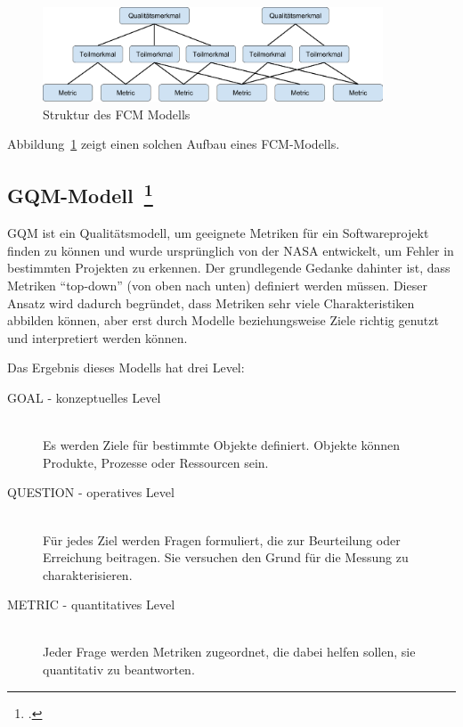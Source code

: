 \begin{savenotes}
  \begin{figure}[H] 
    \centering
    \includegraphics[width=0.9\textwidth]{img/fcm.png}
    \caption{Struktur des \ac{FCM} Modells}\label{fig:fcm}
  \end{figure}
\end{savenotes}

Abbildung~\ref{fig:fcm} zeigt einen solchen Aufbau eines \ac{FCM}-Modells.

\clearpage
\subsection[\ac{GQM}-Modell]{\acf{GQM}-Modell~\footcite[][]{basili_goal_nodate}}

\ac{GQM} ist ein Qualitätsmodell, um geeignete Metriken für ein Softwareprojekt finden zu können und wurde ursprünglich von der \ac{NASA} entwickelt, um Fehler in bestimmten Projekten zu erkennen.
Der grundlegende Gedanke dahinter ist, dass Metriken ``top\mbox{-}down'' (von oben nach unten) definiert werden müssen.
Dieser Ansatz wird dadurch begründet, dass Metriken sehr viele Charakteristiken abbilden können, aber erst durch Modelle beziehungsweise Ziele richtig genutzt und interpretiert werden können.

Das Ergebnis dieses Modells hat drei Level:
\begin{description}
  \item[GOAL \mbox{-} konzeptuelles Level] \hfill \\ Es werden Ziele für bestimmte Objekte definiert. Objekte können Produkte, Prozesse oder Ressourcen sein.
  \item[QUESTION \mbox{-} operatives Level] \hfill \\ Für jedes Ziel werden Fragen formuliert, die zur Beurteilung oder Erreichung beitragen. Sie versuchen den Grund für die Messung zu charakterisieren.
  \item[METRIC \mbox{-} quantitatives Level] \hfill \\ Jeder Frage werden Metriken zugeordnet, die dabei helfen sollen, sie quantitativ zu beantworten.
\end{description}

